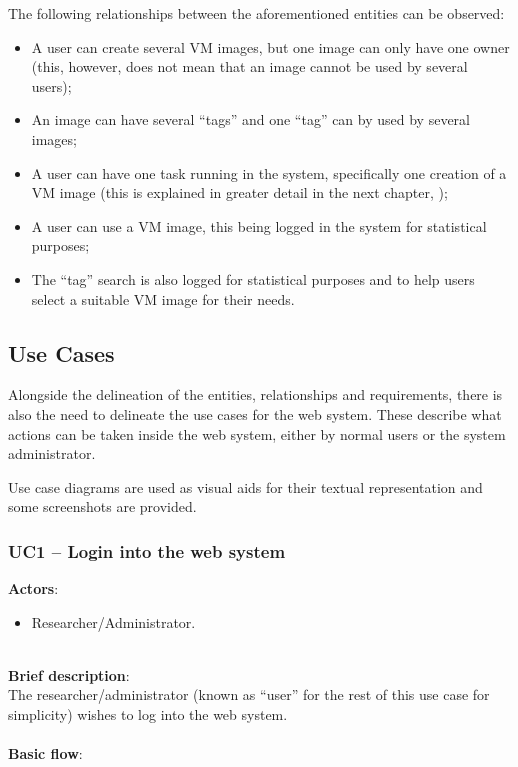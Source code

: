 The following relationships between the aforementioned entities can be observed:

\begin{itemize}
\item A user can create several VM images, but one image can only have one owner (this, however, does not mean that an image cannot be used by several users);
\item An image can have several ``tags'' and one ``tag'' can by used by several images;
\item A user can have one task running in the system, specifically one creation of a VM image (this is explained in greater detail in the next chapter, );
\item A user can use a VM image, this being logged in the system for statistical purposes;
\item The ``tag'' search is also logged for statistical purposes and to help users select a suitable VM image for their needs.
\end{itemize}

\subsection{Use Cases}\label{sec:use-cases}

Alongside the delineation of the entities, relationships and requirements, there is also the need to delineate the use cases for the web system. These describe what actions can be taken inside the web system, either by normal users or the system administrator.

Use case diagrams are used as visual aids for their textual representation and some screenshots are provided. 

\subsubsection{UC1 -- Login into the web system}\label{uc1}

\textbf{Actors}:

\begin{itemize}
\item Researcher/Administrator.
\end{itemize}

\ \\
\textbf{Brief description}:
\ \\
The researcher/administrator (known as ``user'' for the rest of this use case for simplicity) wishes to log into the web system.\\
\ \\
\textbf{Basic flow}:


